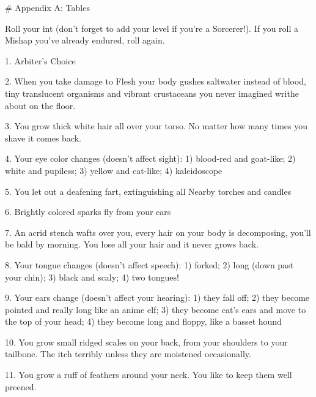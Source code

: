 


# Appendix A: Tables








Roll your {int} (don't forget to add your level if you're a Sorcerer!).   If you roll a Mishap you've already endured, roll again.




1. Arbiter's Choice



2. When you take damage to Flesh your body gushes saltwater instead of blood, tiny translucent organisms and vibrant crustaceans you never imagined writhe about on the floor.


3. You grow thick white hair all over your torso.  No matter how many times you shave it comes back.



4. Your eye color changes (doesn't affect sight): 1) blood-red and goat-like; 2) white and pupiless; 3) yellow and cat-like; 4) kaleidoscope



5. You let out a deafening fart, extinguishing all Nearby torches and candles



6. Brightly colored sparks fly from your ears



7. An acrid stench wafts over you, every hair on your body is decomposing, you'll be bald by morning. You lose all your hair and it never grows back.



8. Your tongue changes (doesn't affect speech): 1) forked; 2) long (down past your chin); 3) black and scaly;  4) two tongues!



9. Your ears change (doesn't affect your hearing):  1) they fall off; 2) they become pointed and really long like an anime elf; 3) they become cat's ears and move to the top of your head; 4) they become long and floppy, like a basset hound




10. You grow small ridged scales on your back, from your shoulders to your tailbone.  The itch terribly unless they are moistened occasionally.  



11. You grow a ruff of feathers around your neck.  You like to keep them well preened.



